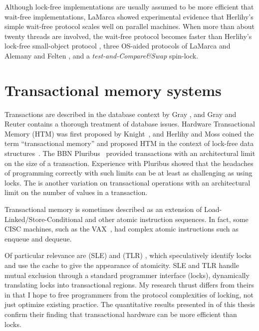 Although lock-free implementations are usually assumed to be more
efficient that wait-free implementations, LaMarca \cite{LaMarca94}
showed experimental evidence that Herlihy's simple
wait-free protocol scales well on parallel machines.
When more than about twenty threads are involved, the wait-free
protocol becomes
faster than Herlihy's lock-free small-object protocol \cite{Herlihy93}, three OS-aided
protocols of LaMarca \cite{LaMarca94} and Alemany and Felten \cite{AlemanyFe92}, and a
\emph{test-and-Compare\&Swap} spin-lock.


\section{Transactional memory systems}\label{sec:tm}

Transactions are described in the database context by Gray
\cite{Gray81b}, and Gray and Reuter \cite{GrayRe93} contains a thorough treatment of
database issues.  Hardware Transactional Memory (HTM) was first
proposed by Knight~\cite{Knight86},
and Herlihy and Moss coined the term ``transactional memory'' and
proposed HTM in the context of lock-free data
structures~\cite{HerlihyMo92,HerlihyMo93}.  The BBN
Pluribus~\cite[Ch.~23]{SiewiorekBeNe82} provided transactions with an
architectural limit on the size of a transaction.  Experience with
Pluribus showed that the headaches of programming correctly with such
limits can be at least as challenging as using locks.  The
 \cite{StoneStHe93} is another variation on transactional
operations with an architectural limit on the number of values in a
transaction.

Transactional memory is sometimes described as an extension of
Load-Linked/Store-Conditional \cite{JensenHaBr87} and other atomic
instruction sequences.  In fact, some CISC machines, such as the
VAX~\cite{Digital96},
had complex atomic instructions such as enqueue and
dequeue.

Of particular relevance are  (SLE) \cite{RajwarGo01} and 
(TLR) \cite{RajwarGo02}, which speculatively identify locks and use
the cache to give the appearance of atomicity.  SLE and TLR handle
mutual exclusion through a standard programmer interface (locks),
dynamically translating locks into transactional regions.  My
research thrust differs from theirs in that I hope to free
programmers from the protocol complexities of locking, not just
optimize existing practice.  The quantitative results presented in
 of this thesis confirm their finding that
transactional hardware can be more efficient than locks.


